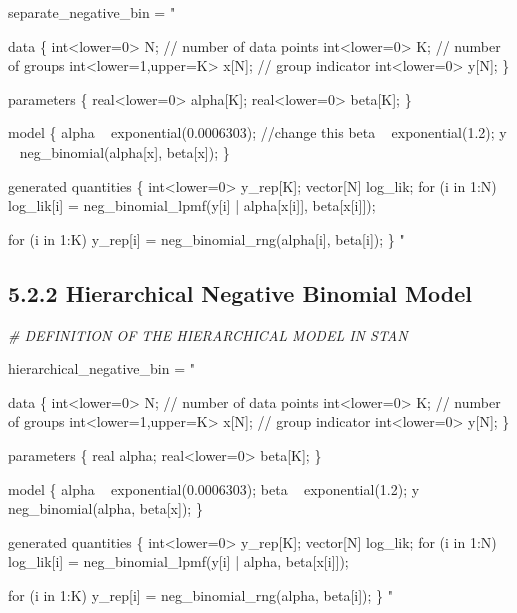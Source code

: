 \documentclass[]{article}
\newenvironment{Shaded}{\begin{snugshade}}{\end{snugshade}}
\newcommand{\StringTok}[1]{\textcolor[rgb]{0.31,0.60,0.02}{#1}}
\newcommand{\CommentTok}[1]{\textcolor[rgb]{0.56,0.35,0.01}{\textit{#1}}}
\newcommand{\NormalTok}[1]{#1}
\begin{document}
\begin{Shaded}
\begin{Highlighting}[]
\NormalTok{separate_negative_bin =}\StringTok{ "}

\StringTok{data \{}
\StringTok{  int<lower=0> N;           // number of data points}
\StringTok{  int<lower=0> K;           // number of groups}
\StringTok{  int<lower=1,upper=K> x[N]; // group indicator}
\StringTok{  int<lower=0> y[N];              }
\StringTok{\}}

\StringTok{parameters \{}
\StringTok{  real<lower=0> alpha[K]; }
\StringTok{  real<lower=0> beta[K];}
\StringTok{\}}

\StringTok{model \{}
\StringTok{  alpha ~ exponential(0.0006303); //change this}
\StringTok{  beta ~ exponential(1.2); }
\StringTok{  y ~ neg_binomial(alpha[x], beta[x]);}
\StringTok{\}}

\StringTok{generated quantities \{}
\StringTok{  int<lower=0> y_rep[K]; }
\StringTok{  vector[N] log_lik; }
\StringTok{  }
\StringTok{  for (i in 1:N) }
\StringTok{    log_lik[i] = neg_binomial_lpmf(y[i] | alpha[x[i]], beta[x[i]]);}

\StringTok{  for (i in 1:K) }
\StringTok{    y_rep[i] = neg_binomial_rng(alpha[i], beta[i]); }
\StringTok{\}}
\StringTok{"}
\end{Highlighting}
\end{Shaded}

\subsection{5.2.2 Hierarchical Negative Binomial
Model}\label{hierarchical-negative-binomial-model}

\begin{Shaded}
\begin{Highlighting}[]
 \CommentTok{# DEFINITION OF THE HIERARCHICAL MODEL IN STAN}

\NormalTok{hierarchical_negative_bin =}\StringTok{ "}

\StringTok{data \{}
\StringTok{  int<lower=0> N;           // number of data points}
\StringTok{  int<lower=0> K;           // number of groups}
\StringTok{  int<lower=1,upper=K> x[N]; // group indicator}
\StringTok{  int<lower=0> y[N];              }
\StringTok{\}}

\StringTok{parameters \{}
\StringTok{  real alpha;}
\StringTok{  real<lower=0> beta[K]; }
\StringTok{\}}

\StringTok{model \{}
\StringTok{  alpha ~ exponential(0.0006303);}
\StringTok{  beta ~ exponential(1.2); }
\StringTok{  y ~ neg_binomial(alpha, beta[x]);}
\StringTok{\}}

\StringTok{generated quantities \{}
\StringTok{  int<lower=0> y_rep[K]; }
\StringTok{  vector[N] log_lik; }
\StringTok{  }
\StringTok{  for (i in 1:N) }
\StringTok{    log_lik[i] = neg_binomial_lpmf(y[i] | alpha, beta[x[i]]);}

\StringTok{  for (i in 1:K) }
\StringTok{    y_rep[i] = neg_binomial_rng(alpha, beta[i]); }
\StringTok{\}}
\StringTok{"}
\end{Highlighting}
\end{Shaded}
\end{document}
